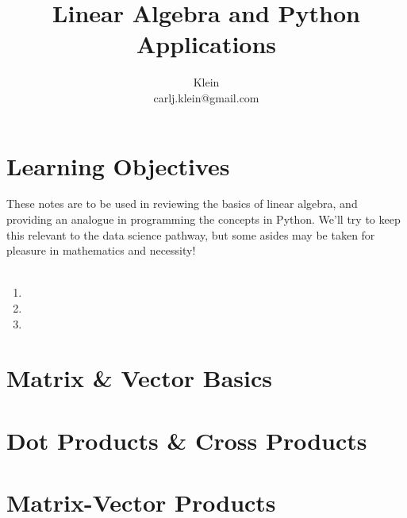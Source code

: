 \documentclass{article}
\begin{document}
	\title{Linear Algebra and Python Applications}
	\author{Klein \\ carlj.klein@gmail.com}
	\date{}
	\maketitle

\section{Learning Objectives}
These notes are to be used in reviewing the basics of linear algebra, and providing an analogue in programming the concepts in Python. We'll try to keep this relevant to the data science pathway, but some asides may be taken for pleasure in mathematics and necessity!
\\\\

\begin{enumerate}
	\item {}
	\item {}
	\item {}
\end{enumerate}

\section{Matrix \& Vector Basics}\label{sec:concept1}


\section{Dot Products \& Cross Products}\label{sec:concept2}

\section{Matrix-Vector Products}\label{sec:concept3}
\end{document}
